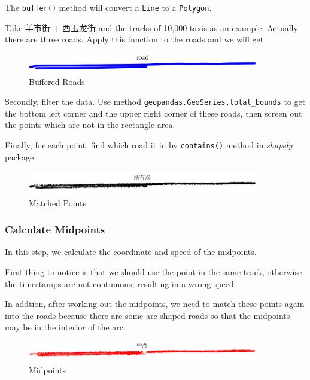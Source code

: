 \documentclass[fontset=none]{ctexart}
\theoremstyle{definition}
\theoremstyle{remark}
\begin{document}
The \texttt{buffer()} method will convert a \texttt{Line} to a \texttt{Polygon}.

Take 羊市街 + 西玉龙街 and the tracks of 10,000 taxis as an example. Actually there are three roads.
Apply this function to the roads and we will get
\begin{figure}[htb]
  \centering
  \includegraphics[width=0.9\textwidth]{images/roads.png}
  \caption{Buffered Roads}
  \label{fig: roads}
\end{figure}

Secondly, filter the data. Use method \texttt{geopandas.GeoSeries.total\_bounds} to get the bottom left corner
and the upper right corner of these roads, then screen out the points which are not in the rectangle area.

Finally, for each point, find which road it in by \texttt{contains()} method in \textit{shapely} package.
\begin{figure}[htb]
  \centering
  \includegraphics[width=0.9\textwidth]{images/all_points_new.png}
  \caption{Matched Points}
  \label{fig: points}
\end{figure}

\subsubsection{Calculate Midpoints}
In this step, we calculate the coordinate and speed of the midpoints.

First thing to notice is that we should use the point in the same track, otherwise the timestamps are not
continuous, resulting in a wrong speed.

In addtion, after working out the midpoints, we need to match these points again into the roads because
there are some arc-shaped roads so that the midpoints may be in the interior of the arc.

\begin{figure}[htb]
  \centering
  \includegraphics[width=0.9\textwidth]{images/midpoints_new.png}
  \caption{Midpoints}
  \label{fig: midpoints}
\end{figure}
\end{document}
